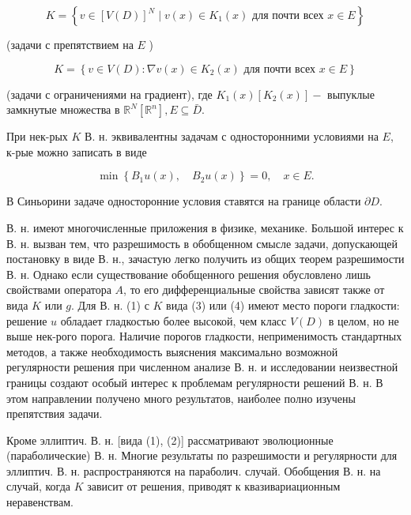 \documentclass[10pt]{article}
\begin{document}
\[

K=\left\{v \in[V(D)]^{N} \mid v(x) \in K_{1}(x) \text { для почти всех } x \in E\right\}

\]



(задачи с препятствием на $E$ )



\[

K=\left\{v \in V(D): \nabla v(x) \in K_{2}(x) \text { для почти всех } x \in E\right\}

\]



(задачи с ограничениями на градиент), где $K_{1}(x)\left[K_{2}(x)\right]-$ выпуклые замкнутые множества в $\mathbb{R}^{N}\left[\mathbb{R}^{n}\right], E \subseteq \bar{D}$.



При нек-рых $K$ В. н. эквивалентны задачам с односторонними условиями на $E$, к-рые можно записать в виде



\[

\min \left\{B_{1} u(x), \quad B_{2} u(x)\right\}=0, \quad x \in E .

\]



В Синьорини задаче односторонние условия ставятся на границе области $\partial D$.



В. н. имеют многочисленные приложения в физике, механике. Большой интерес к В. н. вызван тем, что разрешимость в обобщенном смысле задачи, допускающей постановку в виде В. н., зачастую легко получить из общих теорем разрешимости В. н. Однако если существование обобщенного решения обусловлено лишь свойствами оператора $A$, то его дифференциальные свойства зависят также от вида $K$ или $g$. Для В. н. (1) с $K$ вида (3) или (4) имеют место пороги гладкости: решение $u$ обладает гладкостью более высокой, чем класс $V(D)$ в целом, но не выше нек-рого порога. Наличие порогов гладкости, неприменимость стандартных методов, а также необходимость выяснения максимально возможной регулярности решения при численном анализе В. н. и исследовании неизвестной границы создают особый интерес к проблемам регулярности решений В. н. В этом направлении получено много результатов, наиболее полно изучены препятствия задачи.



Кроме эллиптич. В. н. [вида (1), (2)] рассматривают эволюционные (параболические) В. н. Многие результаты по разрешимости и регулярности для эллиптич. В. н. распространяются на параболич. случай. Обобщения В. н. на случай, когда $K$ зависит от решения, приводят к квазивариационным неравенствам.
\end{document}
